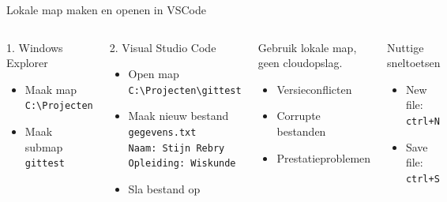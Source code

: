 \documentclass
[kulak] %
{kulakbeamer}
\begin{document}
	\begin{frame}{Lokale map maken en openen in VSCode}
		\begin{columns}[T]
			\begin{block}{1. Windows Explorer}
			\begin{itemize}
				\item Maak map \texttt{C:\textbackslash Projecten}
				\item Maak submap \texttt{gittest}
			\end{itemize}
			\end{block}
			\begin{block}{2. Visual Studio Code}
			\begin{itemize}
				\item Open map \texttt{C:\textbackslash Projecten\textbackslash gittest}
				\item Maak nieuw bestand \texttt{gegevens.txt}\\
                \texttt{Naam: Stijn Rebry}\\
                \texttt{Opleiding: Wiskunde}
				\item Sla bestand op
			\end{itemize}
            \end{block}
			
			\begin{alertblock}{Gebruik lokale map, geen cloudopslag.}
			\begin{itemize}
				\item Versieconflicten
				\item Corrupte bestanden
				\item Prestatieproblemen
			\end{itemize}
		\end{alertblock}

		\begin{exampleblock}{Nuttige sneltoetsen}
			\begin{itemize}
				\item New file: \texttt{ctrl+N}
				\item Save file: \texttt{ctrl+S}
			\end{itemize}
		\end{exampleblock}
		\end{columns}
	\end{frame}
\end{document}
